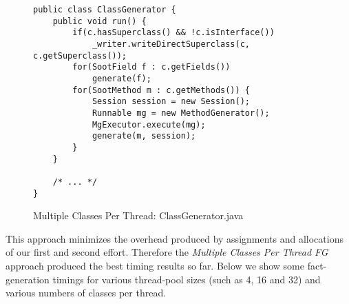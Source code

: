 \documentclass{dithesis}
\begin{document}
        \begin{figure}[H]
\begin{lstlisting}
public class ClassGenerator {
    public void run() {
        if(c.hasSuperclass() && !c.isInterface())
            _writer.writeDirectSuperclass(c, c.getSuperclass());
        for(SootField f : c.getFields())
            generate(f);
        for(SootMethod m : c.getMethods()) {
            Session session = new Session();
            Runnable mg = new MethodGenerator();
            MgExecutor.execute(mg);
            generate(m, session);
        }
    }

    /* ... */
}
\end{lstlisting}
        \caption{Multiple Classes Per Thread: ClassGenerator.java}
        \end{figure}

        This approach minimizes the overhead produced by assignments and allocations of our first and second effort. Therefore the \textit{Multiple Classes Per Thread FG} approach produced the best timing results so far. Below we show some fact-generation timings for various thread-pool sizes (such as 4, 16 and 32) and various numbers of classes per thread.
\end{document}
